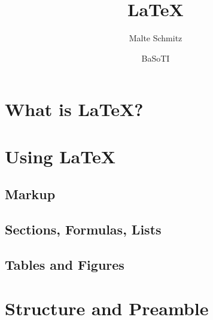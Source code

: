 \documentclass[xcolor=table]{beamer}
\author{Malte Schmitz}
\title{LaTeX}
\institute{Institut für Softwaretechnik und Programmiersprachen}
\date{BaSoTI}
\begin{document}


\section{What is \LaTeX?}

\section{Using \LaTeX{}}
\subsection{Markup}

\subsection{Sections, Formulas, Lists}
\subsection{Tables and Figures}
\section{Structure and Preamble}



\end{document}
